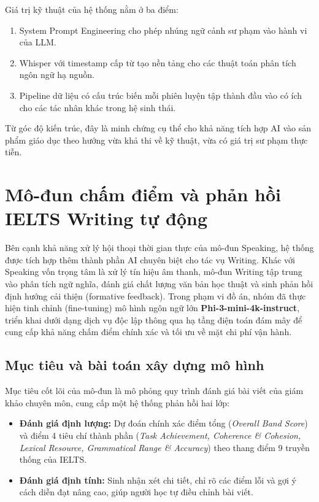 Giá trị kỹ thuật của hệ thống nằm ở ba điểm:

\begin{enumerate}
    \item System Prompt Engineering cho phép nhúng ngữ cảnh sư phạm vào hành vi của LLM.
    \item Whisper với timestamp cấp từ tạo nền tảng cho các thuật toán phân tích ngôn ngữ hạ nguồn.
    \item Pipeline dữ liệu có cấu trúc biến mỗi phiên luyện tập thành đầu vào có ích cho các tác nhân khác trong hệ sinh thái.
\end{enumerate}

Từ góc độ kiến trúc, đây là minh chứng cụ thể cho khả năng tích hợp AI vào sản phẩm giáo dục
theo hướng vừa khả thi về kỹ thuật, vừa có giá trị sư phạm thực tiễn.

\section{Mô-đun chấm điểm và phản hồi IELTS Writing tự động}

Bên cạnh khả năng xử lý hội thoại thời gian thực của mô-đun Speaking, hệ thống được tích hợp thêm thành phần AI chuyên biệt cho tác vụ Writing. Khác với Speaking vốn trọng tâm là xử lý tín hiệu âm thanh, mô-đun Writing tập trung vào phân tích ngữ nghĩa, đánh giá chất lượng văn bản học thuật và sinh phản hồi định hướng cải thiện (formative feedback). Trong phạm vi đồ án, nhóm đã thực hiện tinh chỉnh (fine-tuning) mô hình ngôn ngữ lớn \textbf{Phi-3-mini-4k-instruct}, triển khai dưới dạng dịch vụ độc lập thông qua hạ tầng điện toán đám mây để cung cấp khả năng chấm điểm chính xác và tối ưu về mặt chi phí vận hành.

\subsection{Mục tiêu và bài toán xây dựng mô hình}
Mục tiêu cốt lõi của mô-đun là mô phỏng quy trình đánh giá bài viết của giám khảo chuyên môn, cung cấp một hệ thống phản hồi hai lớp:
\begin{itemize}
    \item \textbf{Đánh giá định lượng:} Dự đoán chính xác điểm tổng (\textit{Overall Band Score}) và điểm 4 tiêu chí thành phần (\textit{Task Achievement, Coherence \& Cohesion, Lexical Resource, Grammatical Range \& Accuracy}) theo thang điểm 9 truyền thống của IELTS.
    \item \textbf{Đánh giá định tính:} Sinh nhận xét chi tiết, chỉ rõ các điểm lỗi và gợi ý cách diễn đạt nâng cao, giúp người học tự điều chỉnh bài viết.
\end{itemize}

